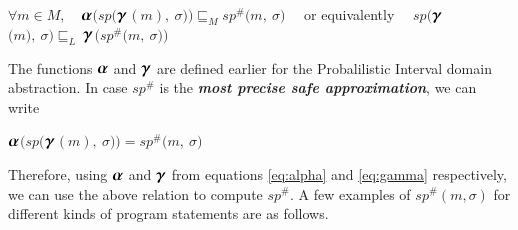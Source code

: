 \documentclass[final,3p, review, times]{Elsevier/elsarticle}
\newcommand{\ALPHA}{\large\boldsymbol{\alpha}\normalsize}
\newcommand{\GAMMA}{\large\boldsymbol{\gamma}\normalsize}
\begin{document}
\centerline{
$\forall m\in M,\quad$$\ALPHA$$\Big(sp\big($$\GAMMA$$(m),\ \sigma\big)\Big)\sqsubseteq_M sp^\#\big(m,\ \sigma\big)\quad$ or equivalently $\quad sp\Big($$\GAMMA$$\big(m\big),\ \sigma\Big)\sqsubseteq_L\ $$\GAMMA$$\Big(sp^\#\big(m,\ \sigma\big)\Big)$
}

The functions $\ALPHA$ and $\GAMMA$ are defined earlier for the Probalilistic Interval domain abstraction. In case $sp^\#$ is the \textbf{\textit{most precise safe approximation}}, we can write

\centerline{
$\ALPHA$$\Big(sp\big($$\GAMMA$$(m),\ \sigma\big)\Big)=sp^\#\big(m,\ \sigma\big)$
}
Therefore, using $\ALPHA$ and $\GAMMA$ from equations \ref{eq:alpha} and \ref{eq:gamma} respectively, we can use the above relation to compute $sp^\#$. A few examples of $sp^\#(m,\sigma)$ for different kinds of program statements are as follows.
\end{document}
